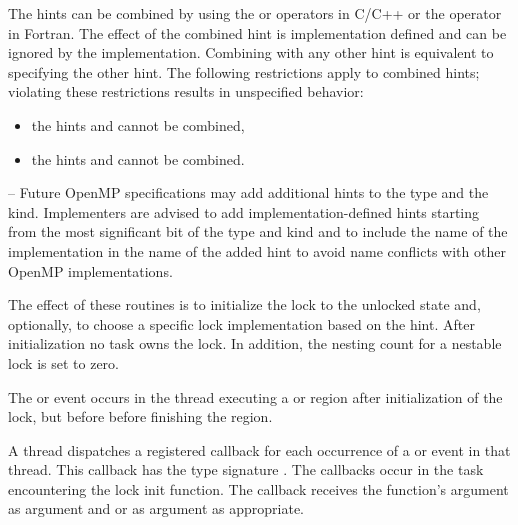 The hints can be combined by using the \code{+} or \code{|} operators in C/C++ or the \code{+} operator in Fortran.  
The effect of the combined hint is implementation defined and can be ignored by the implementation.
Combining  with any other hint is equivalent to specifying the other hint.
The following restrictions apply to combined hints; violating these 
restrictions results in unspecified behavior:
\begin{itemize}
\item the hints  and  cannot be combined,
\item the hints  and  cannot be combined.
\end{itemize}


\notestart
\noteheader – Future OpenMP specifications may add additional hints to the 
 type and the  kind.  
Implementers are advised to add implementation-defined hints starting from 
the most significant bit of the  type and
 kind and to include the name of the 
implementation in the name of the added hint to avoid name conflicts 
with other OpenMP implementations.
\noteend


\effect
The effect of these routines is to initialize the lock to the unlocked state and, optionally, to choose a specific lock implementation based on the hint. 
After initialization no task owns the lock. In addition, the nesting count for a nestable lock is set to zero.

\events

The  or  event occurs in the thread 
executing a  or  region
after initialization of the lock, but before before finishing the region.

\tools

A thread dispatches a registered 
callback for each occurrence of a  or  event 
in that thread.  This callback has the type signature .
The callbacks occur in the task encountering
the lock init function.  The callback receives the function's  argument as
 argument and
 or 
  as  argument as appropriate.

